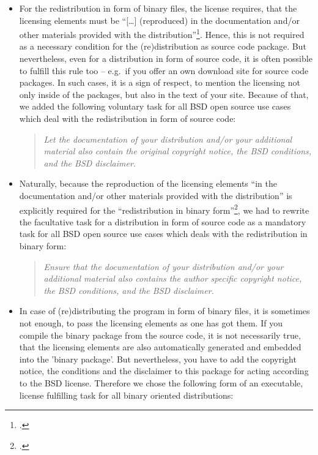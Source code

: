 \begin{itemize}
\item For the redistribution in form of binary files, the license requires,
that the licensing elements must be \enquote{[\ldots] (reproduced) in the documentation
and/or other materials provided with the
distribution}\footcite[cf.][\nopage wp]{BsdLicense2Clause}. Hence, this is
not required as a necessary condition for the (re)distribution as source code
package. But nevertheless, even for a distribution in form of source code, it
is often possible to fulfill this rule too -- e.g.\ if you offer an own download
site for source code packages. In such cases, it is a sign of respect, to
mention the licensing not only inside of the packages, but also in the text of
your site. Because of that, we added the following voluntary task for all BSD
open source use cases which deal with the redistribution in form of source
code:

\begin{quote}\textit{Let the documentation of your distribution and/or your
additional material also contain the original copyright notice, the BSD
conditions, and the BSD disclaimer.}\end{quote}

\item Naturally, because the reproduction of the licensing elements \enquote{in
the documentation and/or other materials provided with the distribution}
is explicitly required for the \enquote{redistribution in binary
form}\footcite[cf.][\nopage wp]{BsdLicense2Clause}, we had to rewrite the
facultative task for a distribution in form of source code as a mandatory task
for all BSD open source use cases which deals with the redistribution in binary
form:

\begin{quote}\textit{Ensure that the documentation of your distribution and/or
your additional material also contains the author specific copyright notice, the
BSD conditions, and the BSD disclaimer.}\end{quote}

\item In case of (re)distributing the program in form of binary files, it is
sometimes not enough, to pass the licensing elements as one has got them. If you
compile the binary package from the source code, it is not necessarily true,
that the licensing elements are also automatically generated and embedded into
the 'binary package'. But nevertheless, you have to add the copyright notice,
the conditions and the disclaimer to this package for acting according to the
BSD license. Therefore we chose the following form of an executable, license
fulfilling task for all binary oriented distributions:


\end{itemize}
